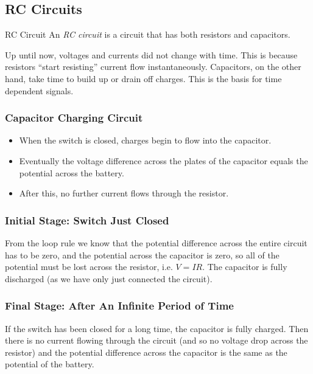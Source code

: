 \documentclass[class=article, crop=false]{standalone}
\begin{document}
  \subsection{RC Circuits}
  \begin{definition}{RC Circuit}
    An \emph{RC circuit} is a circuit that has both resistors and capacitors.
  \end{definition}
  Up until now, voltages and currents did not change with time. This is because resistors ``start resisting'' current flow instantaneously. Capacitors, on the other hand, take time to build up or drain off charges. This is the basis for time dependent signals.
  \subsubsection{Capacitor Charging Circuit}
  \begin{itemize}
    \item When the switch is closed, charges begin to flow into the capacitor.
    \item Eventually the voltage difference across the plates of the capacitor equals the potential across the battery.
    \item After this, no further current flows through the resistor.
  \end{itemize}
  \subsubsection{Initial Stage: Switch Just Closed}
  From the loop rule we know that the potential difference across the entire circuit has to be zero, and the potential across the capacitor is zero, so all of the potential must be lost across the resistor, i.e. $V = IR$. The capacitor is fully discharged (as we have only just connected the circuit).
  \subsubsection{Final Stage: After An Infinite Period of Time}
  If the switch has been closed for a long time, the capacitor is fully charged. Then there is no current flowing through the circuit (and so no voltage drop across the resistor) and the potential difference across the capacitor is the same as the potential of the battery.
\end{document}
